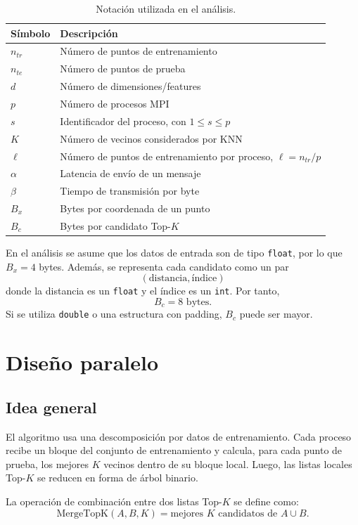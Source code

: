 \documentclass[11pt,a4paper]{article}
\begin{document}
\begin{table}[H]
\centering
\begin{tabular}{ll}
\toprule
Símbolo & Descripción \\
\midrule
$n_{tr}$ & Número de puntos de entrenamiento \\
$n_{te}$ & Número de puntos de prueba \\
$d$ & Número de dimensiones/features \\
$p$ & Número de procesos MPI \\
$s$ & Identificador del proceso, con $1 \leq s \leq p$ \\
$K$ & Número de vecinos considerados por KNN \\
$\ell$ & Número de puntos de entrenamiento por proceso, $\ell = n_{tr}/p$ \\
$\alpha$ & Latencia de envío de un mensaje \\
$\beta$ & Tiempo de transmisión por byte \\
$B_x$ & Bytes por coordenada de un punto \\
$B_c$ & Bytes por candidato Top-$K$ \\
\bottomrule
\end{tabular}
\caption{Notación utilizada en el análisis.}
\end{table}

En el análisis se asume que los datos de entrada son de tipo \texttt{float}, por lo que
$B_x = 4$ bytes. Además, se representa cada candidato como un par
\[
(\text{distancia}, \text{índice})
\]
donde la distancia es un \texttt{float} y el índice es un \texttt{int}. Por tanto,
\[
B_c = 8 \text{ bytes}.
\]
Si se utiliza \texttt{double} o una estructura con padding, $B_c$ puede ser mayor.

\section{Diseño paralelo}

\subsection{Idea general}

El algoritmo usa una descomposición por datos de entrenamiento. Cada proceso recibe un bloque
del conjunto de entrenamiento y calcula, para cada punto de prueba, los mejores $K$ vecinos dentro
de su bloque local. Luego, las listas locales Top-$K$ se reducen en forma de árbol binario.

La operación de combinación entre dos listas Top-$K$ se define como:
\[
\text{MergeTopK}(A,B,K) = \text{mejores } K \text{ candidatos de } A \cup B.
\]
\end{document}
